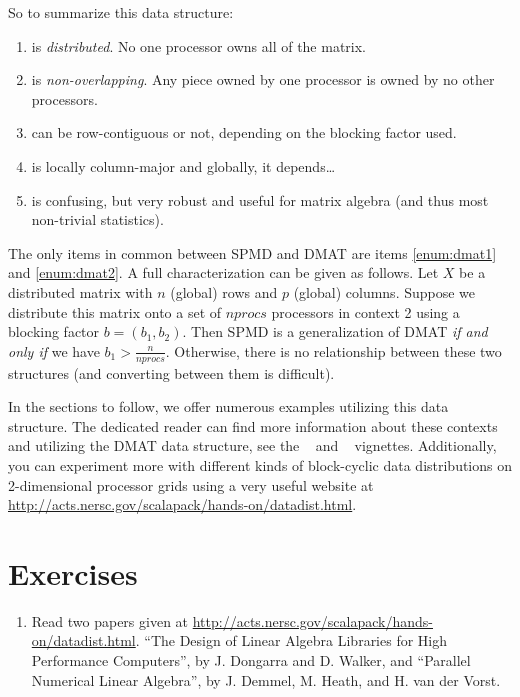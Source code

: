 So to summarize this data structure:
\begin{enumerate}
  \item {} is \emph{distributed}.  No one processor owns all of the matrix. \label{enum:dmat1}
  \item {} is \emph{non-overlapping}. Any piece owned by one processor is owned by no other processors.\label{enum:dmat2} \item {} can be row-contiguous or not, depending on the blocking factor used.
  \item {} is locally column-major and globally, it depends\dots
  \item {} is confusing, but very robust and useful for matrix algebra (and thus most non-trivial statistics).
\end{enumerate}

The only items in common between SPMD and DMAT are items \ref{enum:dmat1} and \ref{enum:dmat2}.  A full characterization can be given as follows.  Let $X$ be a distributed matrix with $n$ (global) rows and $p$ (global) columns.  Suppose we distribute this matrix onto a set of $nprocs$ processors in context 2 using a blocking factor $b=(b_1, b_2)$.  Then SPMD is a generalization of DMAT \emph{if and only if} we have $b_1 > \frac{n}{nprocs}$.  Otherwise, there is no relationship between these two structures (and converting between them is difficult).

In the sections to follow, we offer numerous examples utilizing this data structure.  The dedicated reader can find more information about these contexts and utilizing the DMAT data structure, see the ~\citep{Schmidt2012pbdBASEvignette} and ~\citep{Schmidt2012pbdDMATvignette} vignettes.  Additionally, you can experiment more with different kinds of block-cyclic data distributions on 2-dimensional processor grids using
a very useful website at
\url{http://acts.nersc.gov/scalapack/hands-on/datadist.html}.




\section{Exercises}
\label{sec:statistics_exercise}

\begin{enumerate}[label=\thechapter-\arabic*]
\item
Read two papers given at
\url{http://acts.nersc.gov/scalapack/hands-on/datadist.html}.
``The Design of Linear Algebra Libraries for High Performance Computers'',
by J. Dongarra and D. Walker, and
``Parallel Numerical Linear Algebra'',
by J. Demmel, M. Heath, and H. van der Vorst.

\end{enumerate}




